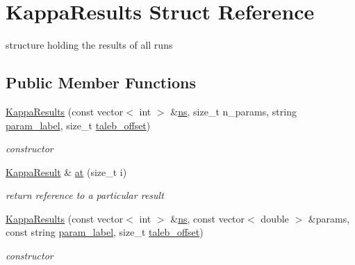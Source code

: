 \hypertarget{structKappaResults}{}\section{Kappa\+Results Struct Reference}
\label{structKappaResults}


structure holding the results of all runs  


\subsection*{Public Member Functions}
\begin{DoxyCompactItemize}
\item 
\mbox{\hyperlink{structKappaResults_afec7f4f7947b997b7bb15c308b66c7d4}{Kappa\+Results}} (const vector$<$ int $>$ \&\mbox{\hyperlink{structKappaResults_a4e6a25c186ed54790616474d54a618c3}{ns}}, size\+\_\+t n\+\_\+params, string \mbox{\hyperlink{structKappaResults_a2b42189a3b7690aedacd6d77c05a1c5b}{param\+\_\+label}}, size\+\_\+t \mbox{\hyperlink{structKappaResults_a133dbed775f98f56566b9571ff05746d}{taleb\+\_\+offset}})
\begin{DoxyCompactList}\small\item\em constructor \end{DoxyCompactList}\item 
\mbox{\label{structKappaResults_a8b791cd3e214acd7fb951d412f7385bc}} 
\mbox{\hyperlink{structKappaResult}{Kappa\+Result}} \& \mbox{\hyperlink{structKappaResults_a8b791cd3e214acd7fb951d412f7385bc}{at}} (size\+\_\+t i)
\begin{DoxyCompactList}\small\item\em return reference to a particular result \end{DoxyCompactList}\item 
\mbox{\hyperlink{structKappaResults_a914068e2f53f303b501adf0e3b92a468}{Kappa\+Results}} (const vector$<$ int $>$ \&\mbox{\hyperlink{structKappaResults_a4e6a25c186ed54790616474d54a618c3}{ns}}, const vector$<$ double $>$ \&params, const string \mbox{\hyperlink{structKappaResults_a2b42189a3b7690aedacd6d77c05a1c5b}{param\+\_\+label}}, size\+\_\+t \mbox{\hyperlink{structKappaResults_a133dbed775f98f56566b9571ff05746d}{taleb\+\_\+offset}})
\begin{DoxyCompactList}\small\item\em constructor \end{DoxyCompactList}\end{DoxyCompactItemize}
